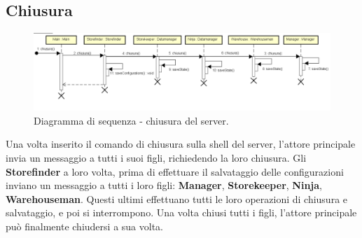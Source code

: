 \documentclass[a4paper]{article}
\begin{document}
       \subsection{Chiusura}
            \begin{figure} [H]
				\centering
				\includegraphics[width=\textwidth]{ST/seq/Chiusura.png}
				\caption{Diagramma di sequenza - chiusura del server.}
			\end{figure}
            Una volta inserito il comando di chiusura sulla shell del server, l'attore principale invia un messaggio a tutti i suoi figli, richiedendo la loro chiusura. Gli \textbf{Storefinder} 
            a loro volta, prima di effettuare il salvataggio delle configurazioni inviano un messaggio a tutti i loro figli: \textbf{Manager}, \textbf{Storekeeper}, \textbf{Ninja}, \textbf{Warehouseman}.
            Questi ultimi effettuano tutti le loro operazioni di chiusura e salvataggio, e poi si interrompono.
            Una volta chiusi tutti i figli, l'attore principale può finalmente chiudersi a sua volta.
            
\end{document}
